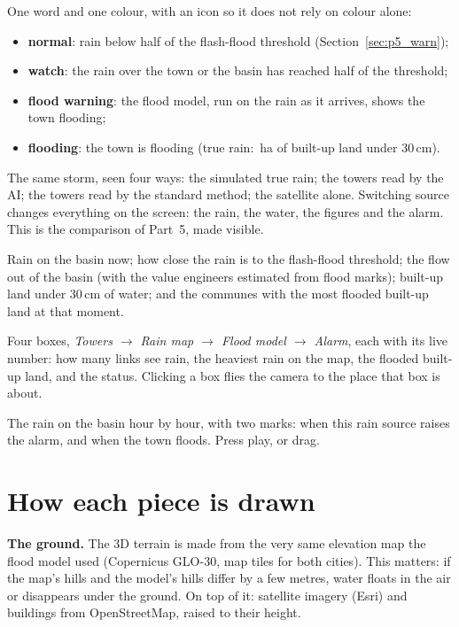 \begin{description}[leftmargin=0pt,itemsep=0.3em]
\item[The status, at the top.] One word and one colour, with an icon so it does not rely on colour alone:
\begin{itemize}
\item \textbf{normal}: rain below half of the flash-flood threshold (Section~\ref{sec:p5_warn});
\item \textbf{watch}: the rain over the town or the basin has reached half of the threshold;
\item \textbf{flood warning}: the flood model, run on the rain as it arrives, shows the town flooding;
\item \textbf{flooding}: the town is flooding (true rain: \PfiveAlgAlarmHa{}\,ha of built-up land under 30\,cm).
\end{itemize}
\item[The rain source, on the left.] The same storm, seen four ways: the simulated true rain; the towers read by the
AI; the towers read by the standard method; the satellite alone. Switching source changes everything on the screen:
the rain, the water, the figures and the alarm. This is the comparison of Part~5, made visible.
\item[The figures, on the right.] Rain on the basin now; how close the rain is to the flash-flood threshold; the flow
out of the basin (with the value engineers estimated from flood marks); built-up land under 30\,cm of water; and the
communes with the most flooded built-up land at that moment.
\item[The chain, at the bottom.] Four boxes, \emph{Towers $\rightarrow$ Rain map $\rightarrow$ Flood model $\rightarrow$
Alarm}, each with its live number: how many links see rain, the heaviest rain on the map, the flooded built-up land,
and the status. Clicking a box flies the camera to the place that box is about.
\item[The timeline.] The rain on the basin hour by hour, with two marks: when this rain source raises the alarm, and
when the town floods. Press play, or drag.
\end{description}

\section{How each piece is drawn}
\label{sec:p6_drawing}
\textbf{The ground.} The 3D terrain is made from the very same elevation map the flood model used (Copernicus GLO-30,
\PsixTiles{} map tiles for both cities). This matters: if the map's hills and the model's hills differ by a few metres,
water floats in the air or disappears under the ground. On top of it: satellite imagery (Esri) and buildings from
OpenStreetMap, raised to their height.

